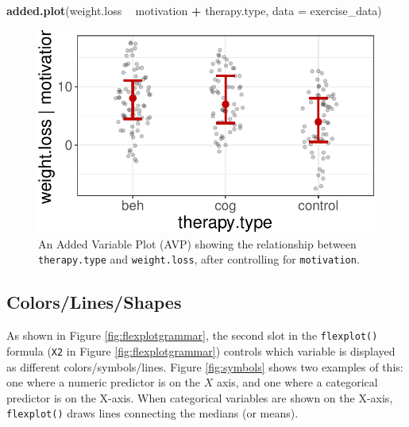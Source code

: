\documentclass[
  man]{apa6}
\newenvironment{Shaded}{\begin{snugshade}}{\end{snugshade}}
\newcommand{\DataTypeTok}[1]{\textcolor[rgb]{0.13,0.29,0.53}{#1}}
\newcommand{\KeywordTok}[1]{\textcolor[rgb]{0.13,0.29,0.53}{\textbf{#1}}}
\newcommand{\NormalTok}[1]{#1}
\newcommand{\OperatorTok}[1]{\textcolor[rgb]{0.81,0.36,0.00}{\textbf{#1}}}
\newcommand{\StringTok}[1]{\textcolor[rgb]{0.31,0.60,0.02}{#1}}
\begin{document}
\begin{Shaded}
\begin{Highlighting}[]
\KeywordTok{added.plot}\NormalTok{(weight.loss }\OperatorTok{~}\StringTok{ }\NormalTok{motivation }\OperatorTok{+}\StringTok{ }\NormalTok{therapy.type, }\DataTypeTok{data =}\NormalTok{ exercise_data)}
\end{Highlighting}
\end{Shaded}

\begin{figure}
\centering
\includegraphics{flexplot_psychmeth_files/figure-latex/avp-1.pdf}
\caption{\label{fig:avp}An Added Variable Plot (AVP) showing the relationship between \texttt{therapy.type} and \texttt{weight.loss}, after controlling for \texttt{motivation}. \label{fig:avp}}
\end{figure}

\hypertarget{colorslinesshapes}{%
\subsection{Colors/Lines/Shapes}\label{colorslinesshapes}}

As shown in Figure \ref{fig:flexplotgrammar}, the second slot in the \texttt{flexplot()} formula (\texttt{X2} in Figure \ref{fig:flexplotgrammar}) controls which variable is displayed as different colors/symbols/lines. Figure \ref{fig:symbols} shows two examples of this: one where a numeric predictor is on the \(X\) axis, and one where a categorical predictor is on the X-axis. When categorical variables are shown on the X-axis, \texttt{flexplot()} draws lines connecting the medians (or means).
\end{document}
